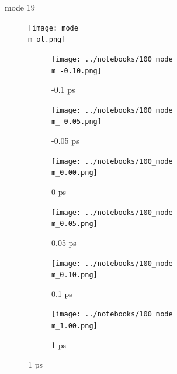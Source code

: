 \documentclass{beamer}
\newcommand\w{0.32}
\begin{document}
\renewcommand\m{19}
\begin{frame}{mode \m}
					\vspace{\vh mm}
	\begin{figure}
		\centering
		\texttt{[image: mode\\m\_ot.png]}
	\end{figure}
	\begin{figure}
		\centering
		\begin{subfigure}[b]{\w\textwidth}
			\centering
			\texttt{[image: ../notebooks/100\_mode\\m\_-0.10.png]}
			\caption{-0.1 ps}
		\end{subfigure}
		\begin{subfigure}[b]{\w\textwidth}
			\centering
			\texttt{[image: ../notebooks/100\_mode\\m\_-0.05.png]}
			\caption{-0.05 ps}
		\end{subfigure}
		\begin{subfigure}[b]{\w\textwidth}
			\centering
			\texttt{[image: ../notebooks/100\_mode\\m\_0.00.png]}
			\caption{0 ps}
		\end{subfigure}
		\begin{subfigure}[b]{\w\textwidth}
			\centering
			\texttt{[image: ../notebooks/100\_mode\\m\_0.05.png]}
			\caption{0.05 ps}
		\end{subfigure}
		\begin{subfigure}[b]{\w\textwidth}
			\centering
			\texttt{[image: ../notebooks/100\_mode\\m\_0.10.png]}
			\caption{0.1 ps}
		\end{subfigure}
		\begin{subfigure}[b]{\w\textwidth}
			\centering
			\texttt{[image: ../notebooks/100\_mode\\m\_1.00.png]}
			\caption{1 ps}
		\end{subfigure}
	\end{figure}
\end{frame}
\end{document}
